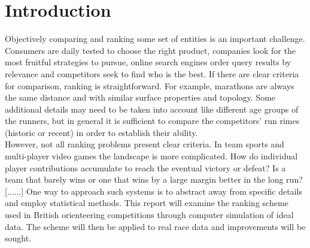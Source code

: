 %

\section{Introduction}

Objectively comparing and ranking some set of entities is an important challenge. Consumers are daily tested to choose the right product, companies look for the most fruitful strategies to pursue, online search engines order query results by relevance and competitors seek to find who is the best. If there are clear criteria for comparison, ranking is straightforward. For example, marathons are always the same distance and with similar surface properties and topology. Some additional details may need to be taken into account like different age groups of the runners, but in general it is sufficient to compare the competitors' run rimes (historic or recent) in order to establish their ability.\\ 
However, not all ranking problems present clear criteria. In team sports and multi-player video games the landscape is more complicated. How do individual player contributions accumulate to reach the eventual victory or defeat? Is a team that barely wins or one that wins by a large margin better in the long run? [......]
One way to approach such systems is to abstract away from specific details and employ statistical methods. This report will examine the ranking scheme used in British orienteering competitions through computer simulation of ideal data. The scheme will then be applied to real race data and improvements will be sought.






